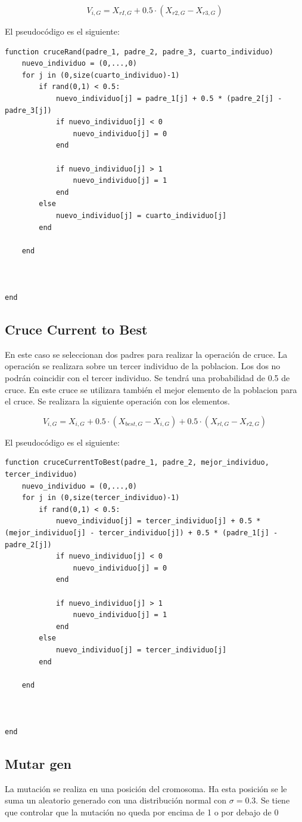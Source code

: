 \documentclass[titlepage]{article}
\begin{document}
	$$
	V_{i, G}=X_{r I, G}+0.5 \cdot\left(X_{r 2, G}-X_{r 3, G}\right)
	$$
	
	El pseudocódigo es el siguiente:
\begin{lstlisting}
function cruceRand(padre_1, padre_2, padre_3, cuarto_individuo)
	nuevo_individuo = (0,...,0)
	for j in (0,size(cuarto_individuo)-1)	
		if rand(0,1) < 0.5:
			nuevo_individuo[j] = padre_1[j] + 0.5 * (padre_2[j] - padre_3[j])
			if nuevo_individuo[j] < 0
				nuevo_individuo[j] = 0
			end
			
			if nuevo_individuo[j] > 1
				nuevo_individuo[j] = 1
			end
		else
			nuevo_individuo[j] = cuarto_individuo[j]
		end
		
	end
	
	

end
\end{lstlisting}	
	\subsection{Cruce Current to Best}
	En este caso se seleccionan dos padres para realizar la operación de cruce. La operación se realizara sobre un tercer individuo de la poblacion. Los dos no podrán coincidir con el tercer individuo. Se tendrá una probabilidad de 0.5 de cruce. En este cruce se utilizara también el mejor elemento de la poblacion para el cruce. Se realizara la siguiente operación con los elementos. 
	
	$$
	V_{i, G}=X_{i, G}+0.5 \cdot\left(X_{b e s t, G}-X_{i, G}\right)+0.5 \cdot\left(X_{r l, G}-X_{r 2, G}\right)
	$$
	
	El pseudocódigo es el siguiente:
	\begin{lstlisting}
function cruceCurrentToBest(padre_1, padre_2, mejor_individuo, tercer_individuo)
	nuevo_individuo = (0,...,0)
	for j in (0,size(tercer_individuo)-1)	
		if rand(0,1) < 0.5:
			nuevo_individuo[j] = tercer_individuo[j] + 0.5 * (mejor_individuo[j] - tercer_individuo[j]) + 0.5 * (padre_1[j] - padre_2[j])
			if nuevo_individuo[j] < 0
				nuevo_individuo[j] = 0
			end
	
			if nuevo_individuo[j] > 1
				nuevo_individuo[j] = 1
			end
		else
			nuevo_individuo[j] = tercer_individuo[j]
		end
	
	end
	
	
	
end
	\end{lstlisting}
	
	\subsection{Mutar gen}
	La mutación se realiza en una posición del cromosoma. Ha esta posición se le suma un aleatorio generado con una distribución normal con $\sigma = 0.3$. Se tiene que controlar que la mutación no queda por encima de 1 o por debajo de 0
	
\end{document}
